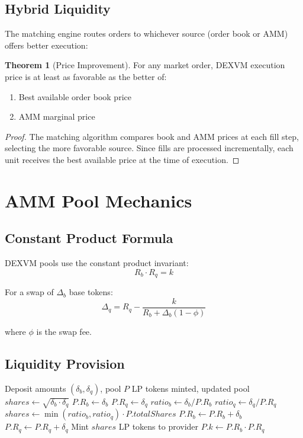 \documentclass[11pt,a4paper]{article}
\theoremstyle{definition}
\newtheorem{theorem}{Theorem}
\begin{document}
\subsection{Hybrid Liquidity}

The matching engine routes orders to whichever source (order book or AMM) offers better execution:

\begin{theorem}[Price Improvement]
For any market order, DEXVM execution price is at least as favorable as the better of:
\begin{enumerate}
    \item Best available order book price
    \item AMM marginal price
\end{enumerate}
\end{theorem}

\begin{proof}
The matching algorithm compares book and AMM prices at each fill step, selecting the more favorable source. Since fills are processed incrementally, each unit receives the best available price at the time of execution.
\end{proof}

\section{AMM Pool Mechanics}

\subsection{Constant Product Formula}

DEXVM pools use the constant product invariant:
\[
R_b \cdot R_q = k
\]

For a swap of $\Delta_b$ base tokens:
\[
\Delta_q = R_q - \frac{k}{R_b + \Delta_b(1 - \phi)}
\]

where $\phi$ is the swap fee.

\subsection{Liquidity Provision}

\begin{algorithm}
\caption{Add Liquidity}
\begin{algorithmic}[1]
\Require Deposit amounts $(\delta_b, \delta_q)$, pool $P$
\Ensure LP tokens minted, updated pool
 
    \State $shares \gets \sqrt{\delta_b \cdot \delta_q}$
    \State $P.R_b \gets \delta_b$
    \State $P.R_q \gets \delta_q$
\Else
    \State $ratio_b \gets \delta_b / P.R_b$
    \State $ratio_q \gets \delta_q / P.R_q$
    \State $shares \gets \min(ratio_b, ratio_q) \cdot P.totalShares$
    \State $P.R_b \gets P.R_b + \delta_b$
    \State $P.R_q \gets P.R_q + \delta_q$
\EndIf
\State Mint $shares$ LP tokens to provider
\State $P.k \gets P.R_b \cdot P.R_q$
\end{algorithmic}
\end{algorithm}
\end{document}
